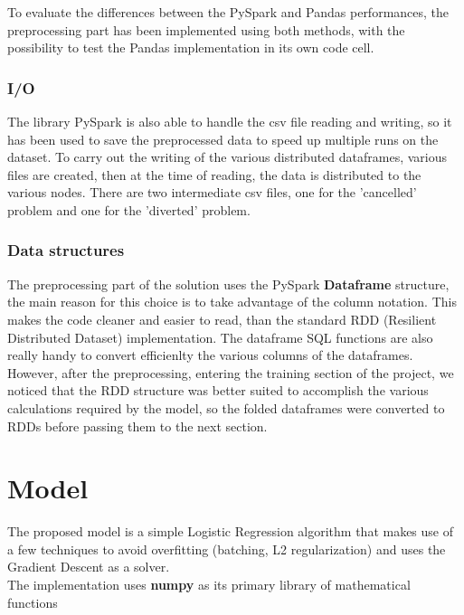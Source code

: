 \documentclass[
	letterpaper, %
	10pt, %
]{class}
\begin{document}
To evaluate the differences between the PySpark and Pandas performances, the preprocessing part has been implemented using both methods, with the possibility to test the Pandas implementation in its own code cell.

\subsubsection{I/O}

The library PySpark is also able to handle the csv file reading and writing, so it has been used to save the preprocessed data to speed up multiple runs on the dataset. To carry out the writing of the various distributed dataframes, various files are created, then at the time of reading, the data is distributed to the various nodes. There are two intermediate csv files, one for the 'cancelled' problem and one for the 'diverted' problem.\\

\subsubsection{Data structures}

The preprocessing part of the solution uses the PySpark \textbf{Dataframe} structure, the main reason for this choice is to take advantage of the column notation. This makes the code cleaner and easier to read, than the standard RDD (Resilient Distributed Dataset) implementation. The dataframe SQL functions are also really handy to convert efficienlty the various columns of the dataframes.
However, after the preprocessing, entering the training section of the project, we noticed that the RDD structure was better suited to accomplish the various calculations required by the model, so the folded dataframes were converted to RDDs before passing them to the next section.


\section{Model}

The proposed model is a simple Logistic Regression \cite{logistic} algorithm that makes use of a few techniques to avoid overfitting (batching, L2 regularization) and uses the Gradient Descent as a solver.\\
The implementation uses \textbf{numpy} \cite{numpy} as its primary library of mathematical functions
\end{document}
